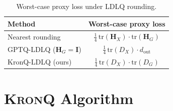 \documentclass{article} %
\newcommand{\KronQ}{\textsc{KronQ}}
\begin{document}
\begin{table}[h]
\centering
\small
\caption{Worst-case proxy loss under LDLQ rounding.}
\label{tab:optimality}
\begin{tabular}{lc}
\toprule
\textbf{Method} & \textbf{Worst-case proxy loss} \\
\midrule
Nearest rounding & $\tfrac{1}{4}\,\mathrm{tr}(\mathbf{H}_X)\cdot\mathrm{tr}(\mathbf{H}_G)$ \\ 
GPTQ-LDLQ ($\mathbf{H}_G = \mathbf{I}$) & $\tfrac{1}{4}\,\mathrm{tr}(D_X)\cdot d_{\mathrm{out}}$ \\
KronQ-LDLQ (ours) & $\tfrac{1}{4}\,\mathrm{tr}(D_X)\cdot\mathrm{tr}(D_G)$ \\
\bottomrule
\end{tabular}
\end{table}

\section{\KronQ{} Algorithm}
\label{appendix:alg}
\end{document}
